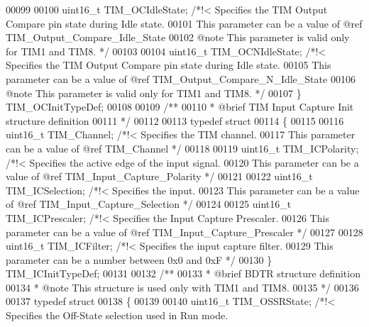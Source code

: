 \begin{DoxyCode}
00099 
00100   uint16\_t TIM_OCIdleState;   \textcolor{comment}{/*!< Specifies the TIM Output Compare pin state during Idle state.}
00101 \textcolor{comment}{                                   This parameter can be a value of @ref TIM\_Output\_Compare\_Idle\_State}
00102 \textcolor{comment}{                                   @note This parameter is valid only for TIM1 and TIM8. */}
00103 
00104   uint16\_t TIM_OCNIdleState;  \textcolor{comment}{/*!< Specifies the TIM Output Compare pin state during Idle state.}
00105 \textcolor{comment}{                                   This parameter can be a value of @ref
       TIM\_Output\_Compare\_N\_Idle\_State}
00106 \textcolor{comment}{                                   @note This parameter is valid only for TIM1 and TIM8. */}
00107 \} TIM\_OCInitTypeDef;
00108 
00109 \textcolor{comment}{/** }
00110 \textcolor{comment}{  * @brief  TIM Input Capture Init structure definition  }
00111 \textcolor{comment}{  */}
00112 
00113 \textcolor{keyword}{typedef} \textcolor{keyword}{struct}
00114 \{
00115 
00116   uint16\_t TIM_Channel;      \textcolor{comment}{/*!< Specifies the TIM channel.}
00117 \textcolor{comment}{                                  This parameter can be a value of @ref TIM\_Channel */}
00118 
00119   uint16\_t TIM_ICPolarity;   \textcolor{comment}{/*!< Specifies the active edge of the input signal.}
00120 \textcolor{comment}{                                  This parameter can be a value of @ref TIM\_Input\_Capture\_Polarity */}
00121 
00122   uint16\_t TIM_ICSelection;  \textcolor{comment}{/*!< Specifies the input.}
00123 \textcolor{comment}{                                  This parameter can be a value of @ref TIM\_Input\_Capture\_Selection */}
00124 
00125   uint16\_t TIM_ICPrescaler;  \textcolor{comment}{/*!< Specifies the Input Capture Prescaler.}
00126 \textcolor{comment}{                                  This parameter can be a value of @ref TIM\_Input\_Capture\_Prescaler */}
00127 
00128   uint16\_t TIM_ICFilter;     \textcolor{comment}{/*!< Specifies the input capture filter.}
00129 \textcolor{comment}{                                  This parameter can be a number between 0x0 and 0xF */}
00130 \} TIM\_ICInitTypeDef;
00131 
00132 \textcolor{comment}{/** }
00133 \textcolor{comment}{  * @brief  BDTR structure definition }
00134 \textcolor{comment}{  * @note   This structure is used only with TIM1 and TIM8.    }
00135 \textcolor{comment}{  */}
00136 
00137 \textcolor{keyword}{typedef} \textcolor{keyword}{struct}
00138 \{
00139 
00140   uint16\_t TIM_OSSRState;        \textcolor{comment}{/*!< Specifies the Off-State selection used in Run mode.}

\end{DoxyCode}
